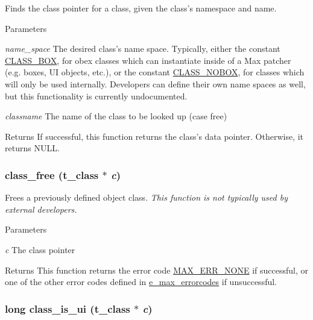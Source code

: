 Finds the class pointer for a class, given the class's namespace and name. 
\begin{DoxyParams}{Parameters}
\item[{\em name\_\-space}]The desired class's name space. Typically, either the constant \hyperlink{group__class_gaf640c99a1fceb8158c2d1e77381b0320}{CLASS\_\-BOX}, for obex classes which can instantiate inside of a Max patcher (e.g. boxes, UI objects, etc.), or the constant \hyperlink{group__class_ga090d3cbc4f137661806fc1b72249a791}{CLASS\_\-NOBOX}, for classes which will only be used internally. Developers can define their own name spaces as well, but this functionality is currently undocumented. \item[{\em classname}]The name of the class to be looked up (case free)\end{DoxyParams}
\begin{DoxyReturn}{Returns}
If successful, this function returns the class's data pointer. Otherwise, it returns NULL. 
\end{DoxyReturn}
\hypertarget{group__class_ga1df757149b7ad2f1d37178c5c184935f}{
\subsubsection[{class\_\-free}]{ class\_\-free ({\bf t\_\-class} $\ast$ {\em c})}}
\label{group__class_ga1df757149b7ad2f1d37178c5c184935f}


Frees a previously defined object class. {\itshape This function is not typically used by external developers.\/}


\begin{DoxyParams}{Parameters}
\item[{\em c}]The class pointer \end{DoxyParams}
\begin{DoxyReturn}{Returns}
This function returns the error code \hyperlink{group__misc_gga0764dd6c02b76cca7d053ae50555d69da6d22f77fef8b1e1b074cef5d29d935fd}{MAX\_\-ERR\_\-NONE} if successful, or one of the other error codes defined in \hyperlink{group__misc_ga0764dd6c02b76cca7d053ae50555d69d}{e\_\-max\_\-errorcodes} if unsuccessful. 
\end{DoxyReturn}
\hypertarget{group__class_ga8c3f01e90f8adbc3c9b06e376d6a7fae}{
\subsubsection[{class\_\-is\_\-ui}]{\setlength{\rightskip}{0pt plus 5cm}long class\_\-is\_\-ui ({\bf t\_\-class} $\ast$ {\em c})}}
\label{group__class_ga8c3f01e90f8adbc3c9b06e376d6a7fae}



